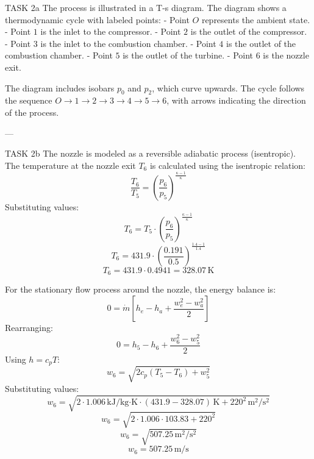 TASK 2a  
The process is illustrated in a T-s diagram. The diagram shows a thermodynamic cycle with labeled points:  
- Point \( O \) represents the ambient state.  
- Point \( 1 \) is the inlet to the compressor.  
- Point \( 2 \) is the outlet of the compressor.  
- Point \( 3 \) is the inlet to the combustion chamber.  
- Point \( 4 \) is the outlet of the combustion chamber.  
- Point \( 5 \) is the outlet of the turbine.  
- Point \( 6 \) is the nozzle exit.  

The diagram includes isobars \( p_0 \) and \( p_2 \), which curve upwards. The cycle follows the sequence \( O \to 1 \to 2 \to 3 \to 4 \to 5 \to 6 \), with arrows indicating the direction of the process.  

---

TASK 2b  
The nozzle is modeled as a reversible adiabatic process (isentropic). The temperature at the nozzle exit \( T_6 \) is calculated using the isentropic relation:  
\[
\frac{T_6}{T_5} = \left( \frac{p_6}{p_5} \right)^{\frac{\kappa-1}{\kappa}}
\]  
Substituting values:  
\[
T_6 = T_5 \cdot \left( \frac{p_6}{p_5} \right)^{\frac{\kappa-1}{\kappa}}
\]  
\[
T_6 = 431.9 \cdot \left( \frac{0.191}{0.5} \right)^{\frac{1.4-1}{1.4}}
\]  
\[
T_6 = 431.9 \cdot 0.4941 = 328.07 \, \text{K}
\]  

For the stationary flow process around the nozzle, the energy balance is:  
\[
0 = \dot{m} \left[ h_e - h_a + \frac{w_e^2 - w_a^2}{2} \right]
\]  
Rearranging:  
\[
0 = h_5 - h_6 + \frac{w_6^2 - w_5^2}{2}
\]  
Using \( h = c_p T \):  
\[
w_6 = \sqrt{2 c_p (T_5 - T_6) + w_5^2}
\]  
Substituting values:  
\[
w_6 = \sqrt{2 \cdot 1.006 \, \text{kJ/kg·K} \cdot (431.9 - 328.07) \, \text{K} + 220^2 \, \text{m}^2/\text{s}^2}
\]  
\[
w_6 = \sqrt{2 \cdot 1.006 \cdot 103.83 + 220^2}
\]  
\[
w_6 = \sqrt{507.25 \, \text{m}^2/\text{s}^2}
\]  
\[
w_6 = 507.25 \, \text{m/s}
\]